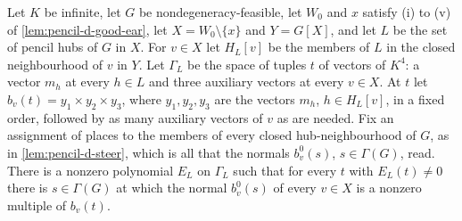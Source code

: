 \begin{lemma}
  \label{lem:pencil-d-ear-extend}
  \leanok
  Let $K$ be infinite, let $G$ be nondegeneracy-feasible, let $W_0$ and
  $x$ satisfy (i) to (v) of \cref{lem:pencil-d-good-ear}, let
  $X = W_0 \setminus \{x\}$ and $Y = G[X]$, and let $L$ be the set of
  pencil hubs of $G$ in $X$. For $v \in X$ let $H_L[v]$ be the members
  of $L$ in the closed neighbourhood of $v$ in $Y$. Let $\Gamma_L$ be the
  space of tuples $t$ of vectors of $K^4$: a vector $m_h$ at every
  $h \in L$ and three auxiliary vectors at every $v \in X$. At $t$ let
  $b_v(t) = y_1 \times y_2 \times y_3$, where $y_1, y_2, y_3$ are the
  vectors $m_h$, $h \in H_L[v]$, in a fixed order, followed by as many
  auxiliary vectors of $v$ as are needed. Fix an assignment of places to
  the members of every closed hub-neighbourhood of $G$, as in
  \cref{lem:pencil-d-steer}, which is all that the normals $b^0_v(s)$,
  $s \in \Gamma(G)$, read. There is a nonzero polynomial $E_L$ on
  $\Gamma_L$ such that for every $t$ with $E_L(t) \ne 0$ there is
  $s \in \Gamma(G)$ at which the normal $b^0_v(s)$ of every $v \in X$ is a
  nonzero multiple of $b_v(t)$.
\end{lemma}

